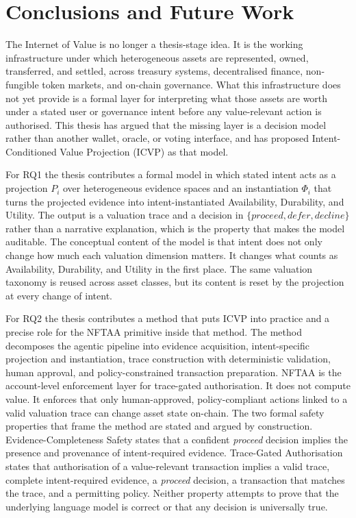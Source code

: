 \section{Conclusions and Future Work}
\label{sec:conclusions}

The Internet of Value is no longer a thesis-stage idea. It is the working infrastructure under which heterogeneous assets are represented, owned, transferred, and settled, across treasury systems, decentralised finance, non-fungible token markets, and on-chain governance. What this infrastructure does not yet provide is a formal layer for interpreting what those assets are worth under a stated user or governance intent before any value-relevant action is authorised. This thesis has argued that the missing layer is a decision model rather than another wallet, oracle, or voting interface, and has proposed Intent-Conditioned Value Projection (ICVP) as that model.

For RQ1 the thesis contributes a formal model in which stated intent acts as a projection $P_i$ over heterogeneous evidence spaces and an instantiation $\Phi_i$ that turns the projected evidence into intent-instantiated Availability, Durability, and Utility. The output is a valuation trace and a decision in $\{\textit{proceed}, \textit{defer}, \textit{decline}\}$ rather than a narrative explanation, which is the property that makes the model auditable. The conceptual content of the model is that intent does not only change how much each valuation dimension matters. It changes what counts as Availability, Durability, and Utility in the first place. The same valuation taxonomy is reused across asset classes, but its content is reset by the projection at every change of intent.

For RQ2 the thesis contributes a method that puts ICVP into practice and a precise role for the NFTAA primitive inside that method. The method decomposes the agentic pipeline into evidence acquisition, intent-specific projection and instantiation, trace construction with deterministic validation, human approval, and policy-constrained transaction preparation. NFTAA is the account-level enforcement layer for trace-gated authorisation. It does not compute value. It enforces that only human-approved, policy-compliant actions linked to a valid valuation trace can change asset state on-chain. The two formal safety properties that frame the method are stated and argued by construction. Evidence-Completeness Safety states that a confident \textit{proceed} decision implies the presence and provenance of intent-required evidence. Trace-Gated Authorisation states that authorisation of a value-relevant transaction implies a valid trace, complete intent-required evidence, a \textit{proceed} decision, a transaction that matches the trace, and a permitting policy. Neither property attempts to prove that the underlying language model is correct or that any decision is universally true.

